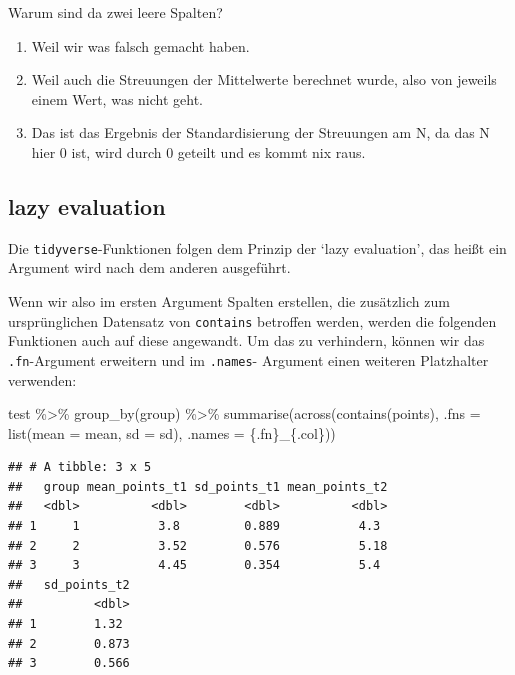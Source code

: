 \documentclass[
]{book}
\newenvironment{Shaded}{\begin{snugshade}}{\end{snugshade}}
\newcommand{\AttributeTok}[1]{\textcolor[rgb]{0.77,0.63,0.00}{#1}}
\newcommand{\FunctionTok}[1]{\textcolor[rgb]{0.00,0.00,0.00}{#1}}
\newcommand{\NormalTok}[1]{#1}
\newcommand{\SpecialCharTok}[1]{\textcolor[rgb]{0.00,0.00,0.00}{#1}}
\newcommand{\StringTok}[1]{\textcolor[rgb]{0.31,0.60,0.02}{#1}}
\providecommand{\tightlist}{%
  \setlength{\itemsep}{0pt}\setlength{\parskip}{0pt}}
\begin{document}
Warum sind da zwei leere Spalten?

\begin{enumerate}
\def\labelenumi{\arabic{enumi}.}
\tightlist
\item
  Weil wir was falsch gemacht haben.
\item
  Weil auch die Streuungen der Mittelwerte berechnet wurde, also von jeweils einem Wert, was nicht geht.
\item
  Das ist das Ergebnis der Standardisierung der Streuungen am N, da das N hier 0 ist, wird durch 0 geteilt und es kommt nix raus.
\end{enumerate}

\hypertarget{lazy-evaluation}{%
\subsection{lazy evaluation}\label{lazy-evaluation}}

Die \texttt{tidyverse}-Funktionen folgen dem Prinzip der `lazy evaluation', das heißt ein Argument wird nach dem anderen ausgeführt.

Wenn wir also im ersten Argument Spalten erstellen, die zusätzlich zum ursprünglichen Datensatz von \texttt{contains} betroffen werden, werden die folgenden Funktionen auch auf diese angewandt. Um das zu verhindern, können wir das \texttt{.fn}-Argument erweitern und im \texttt{.names}- Argument einen weiteren Platzhalter verwenden:

\begin{Shaded}
\begin{Highlighting}[]
\NormalTok{test }\SpecialCharTok{\%\textgreater{}\%} 
  \FunctionTok{group\_by}\NormalTok{(group) }\SpecialCharTok{\%\textgreater{}\%} 
  \FunctionTok{summarise}\NormalTok{(}\FunctionTok{across}\NormalTok{(}\FunctionTok{contains}\NormalTok{(}\StringTok{\textquotesingle{}points\textquotesingle{}}\NormalTok{),}
                   \AttributeTok{.fns =} \FunctionTok{list}\NormalTok{(}\AttributeTok{mean =}\NormalTok{ mean,}
                               \AttributeTok{sd =}\NormalTok{ sd), }
                   \AttributeTok{.names =} \StringTok{\textquotesingle{}\{.fn\}\_\{.col\}\textquotesingle{}}\NormalTok{))}
\end{Highlighting}
\end{Shaded}

\begin{verbatim}
## # A tibble: 3 x 5
##   group mean_points_t1 sd_points_t1 mean_points_t2
##   <dbl>          <dbl>        <dbl>          <dbl>
## 1     1           3.8         0.889           4.3 
## 2     2           3.52        0.576           5.18
## 3     3           4.45        0.354           5.4 
##   sd_points_t2
##          <dbl>
## 1        1.32 
## 2        0.873
## 3        0.566
\end{verbatim}
\end{document}
